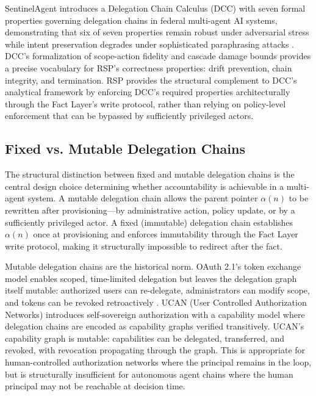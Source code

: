 SentinelAgent introduces a Delegation Chain Calculus (DCC) with seven formal properties governing delegation chains in federal multi-agent AI systems, demonstrating that six of seven properties remain robust under adversarial stress while intent preservation degrades under sophisticated paraphrasing attacks \cite{sentinelagent2026}. DCC's formalization of scope-action fidelity and cascade damage bounds provides a precise vocabulary for RSP's correctness properties: drift prevention, chain integrity, and termination. RSP provides the structural complement to DCC's analytical framework by enforcing DCC's required properties architecturally through the Fact Layer's write protocol, rather than relying on policy-level enforcement that can be bypassed by sufficiently privileged actors.

\subsection{Fixed vs. Mutable Delegation Chains}

The structural distinction between fixed and mutable delegation chains is the central design choice determining whether accountability is achievable in a multi-agent system. A mutable delegation chain allows the parent pointer $\alpha(n)$ to be rewritten after provisioning---by administrative action, policy update, or by a sufficiently privileged actor. A fixed (immutable) delegation chain establishes $\alpha(n)$ once at provisioning and enforces immutability through the Fact Layer write protocol, making it structurally impossible to redirect after the fact.

Mutable delegation chains are the historical norm. OAuth 2.1's token exchange model enables scoped, time-limited delegation but leaves the delegation graph itself mutable: authorized users can re-delegate, administrators can modify scope, and tokens can be revoked retroactively \cite{UCAN}. UCAN (User Controlled Authorization Networks) introduces self-sovereign authorization with a capability model where delegation chains are encoded as capability graphs verified transitively. UCAN's capability graph is mutable: capabilities can be delegated, transferred, and revoked, with revocation propagating through the graph. This is appropriate for human-controlled authorization networks where the principal remains in the loop, but is structurally insufficient for autonomous agent chains where the human principal may not be reachable at decision time.

